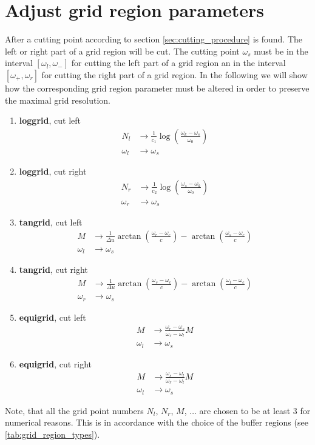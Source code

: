 \section{Adjust grid region parameters}\label{sec:app_cutting_gr}
After a cutting point according to section \ref{sec:cutting_procedure} is found. The left or right part of a grid region will be cut. The cutting point $\omega_s$ must be in the interval $[\omega_l, \omega_-]$ for cutting the left part of a grid region an in the interval $[\omega_+, \omega_r]$ for cutting the right part of a grid region. In the following we will show how the corresponding grid region parameter must be altered in order to preserve the maximal grid resolution. 
\begin{enumerate}
	\item {\bf loggrid}, cut left
	\begin{align*}
		N_l&\to\frac{1}{c_1} \log\left(\frac{\omega_k -\omega_s}{\omega_0}\right) \\
		\omega_l&\to\omega_s
	\end{align*}
	\item {\bf loggrid}, cut right
	\begin{align*}
		N_r&\to\frac{1}{c_2} \log\left(\frac{\omega_s -\omega_k}{\omega_0}\right) \\
		\omega_r&\to\omega_s
	\end{align*}
	\item {\bf tangrid}, cut left
	\begin{align*}
                 M&\to\frac{1}{\Delta u} \arctan \left( \frac{\omega_r-\omega_c}{c} \right)-\arctan \left( \frac{\omega_s-\omega_c}{c} \right)\\
		\omega_l&\to\omega_s
	\end{align*}
	\item {\bf tangrid}, cut right
	\begin{align*}
                 M&\to\frac{1}{\Delta u} \arctan \left( \frac{\omega_s-\omega_c}{c} \right)-\arctan \left( \frac{\omega_l-\omega_c}{c} \right)\\
		\omega_r&\to\omega_s
	\end{align*}
	\item {\bf equigrid}, cut left
	\begin{align*}
                 M&\to\frac{\omega_r-\omega_s}{\omega_r-\omega_l} M\\
		\omega_l&\to\omega_s
	\end{align*}
	\item {\bf equigrid}, cut right
	\begin{align*}
                 M&\to\frac{\omega_s-\omega_l}{\omega_r-\omega_l} M\\
		\omega_l&\to\omega_s
	\end{align*}
\end{enumerate}
Note, that all the grid point numbers $N_l$, $N_r$, $M$, $\dots$ are chosen to be at least $3$ for numerical reasons. This is in accordance with the choice of the buffer regions (see \ref{tab:grid_region_types}).









